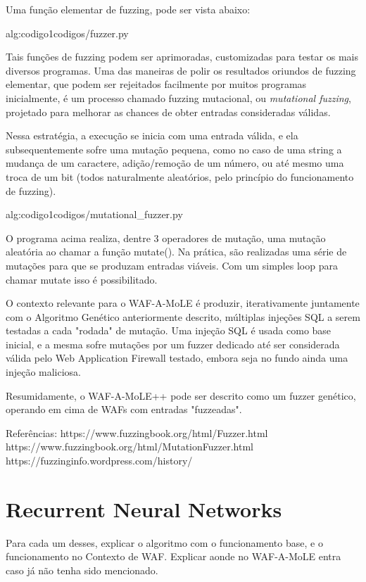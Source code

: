 Uma função elementar de fuzzing, pode ser vista abaixo:

 {alg:codigo1}{codigos/fuzzer.py}

\bigskip
Tais funções de fuzzing podem ser aprimoradas, customizadas para testar os mais diversos programas. Uma das maneiras de polir os resultados oriundos de fuzzing elementar, que podem ser rejeitados facilmente por muitos programas inicialmente, é um processo chamado fuzzing mutacional, ou \textit{mutational fuzzing}, projetado para melhorar as chances de obter entradas consideradas válidas.

Nessa estratégia, a execução se inicia com uma entrada válida, e ela subsequentemente sofre uma mutação pequena, como no caso de uma string a mudança de um caractere, adição/remoção de um número, ou até mesmo uma troca de um bit (todos naturalmente aleatórios, pelo princípio do funcionamento de fuzzing).

 {alg:codigo1}{codigos/mutational_fuzzer.py}

\bigskip
O programa acima realiza, dentre 3 operadores de mutação, uma mutação aleatória ao chamar a função mutate(). Na prática, são realizadas uma série de mutações para que se produzam entradas viáveis. Com um simples loop para chamar mutate isso é possibilitado.

O contexto relevante para o WAF-A-MoLE é produzir, iterativamente juntamente com o Algoritmo Genético anteriormente descrito, múltiplas injeções SQL a serem testadas a cada "rodada" de mutação. Uma injeção SQL é usada como base inicial, e a mesma sofre mutações por um fuzzer dedicado até ser considerada válida pelo Web Application Firewall testado, embora seja no fundo ainda uma injeção maliciosa.


Resumidamente, o WAF-A-MoLE++ pode ser descrito como um fuzzer genético, operando em cima de WAFs com entradas "fuzzeadas".

Referências:
https://www.fuzzingbook.org/html/Fuzzer.html
https://www.fuzzingbook.org/html/MutationFuzzer.html
https://fuzzinginfo.wordpress.com/history/

\section{Recurrent Neural Networks}

Para cada um desses, explicar o algoritmo com o funcionamento base, e o funcionamento no Contexto de WAF. Explicar aonde no WAF-A-MoLE entra caso já não tenha sido mencionado. 

